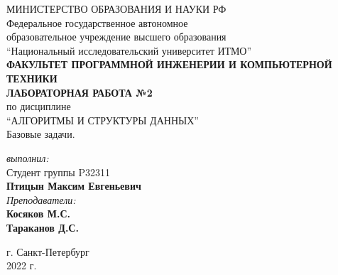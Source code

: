 \thispagestyle{empty}
\BgThispage
\begin{center}
	МИНИСТЕРСТВО ОБРАЗОВАНИЯ И НАУКИ РФ\\
	\hfill \break
	Федеральное государственное автономное\\
	образовательное учреждение высшего образования\\
	``Национальный исследовательский университет ИТМО''\\
	\hfill \break
	\textbf{ФАКУЛЬТЕТ ПРОГРАММНОЙ ИНЖЕНЕРИИ И КОМПЬЮТЕРНОЙ ТЕХНИКИ}\\
	\vspace{2cm}
	\large{\textbf{ЛАБОРАТОРНАЯ РАБОТА №2}}\\
	\hfill \break
	по дисциплине\\
	\large{``АЛГОРИТМЫ И СТРУКТУРЫ ДАННЫХ''}\\
	Базовые задачи.\\
	\hfill \break
	\vspace{3cm}
	\begin{flushright}
	\textit{выполнил:}\\
	Студент группы P32311\\
	\textbf{Птицын Максим Евгеньевич}\\
	\textit{Преподаватели:}\\
	\textbf{Косяков М.С.} \\
	\textbf{Тараканов Д.С.}
	\end{flushright}
\end{center}

\vfill

\begin{center} г. Санкт-Петербург\\2022 г.
\end{center}
\thispagestyle{empty}

\newpage
